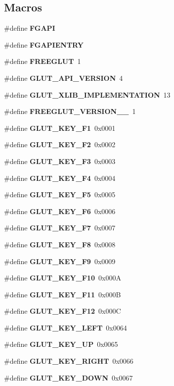 \subsection*{Macros}
\begin{DoxyCompactItemize}
\item 
\#define {\bf F\+G\+A\+P\+I}
\item 
\#define {\bf F\+G\+A\+P\+I\+E\+N\+T\+R\+Y}
\item 
\#define {\bf F\+R\+E\+E\+G\+L\+U\+T}~1
\item 
\#define {\bf G\+L\+U\+T\+\_\+\+A\+P\+I\+\_\+\+V\+E\+R\+S\+I\+O\+N}~4
\item 
\#define {\bf G\+L\+U\+T\+\_\+\+X\+L\+I\+B\+\_\+\+I\+M\+P\+L\+E\+M\+E\+N\+T\+A\+T\+I\+O\+N}~13
\item 
\#define {\bf F\+R\+E\+E\+G\+L\+U\+T\+\_\+\+V\+E\+R\+S\+I\+O\+N\+\_\+\_}~1
\item 
\#define {\bf G\+L\+U\+T\+\_\+\+K\+E\+Y\+\_\+\+F1}~0x0001
\item 
\#define {\bf G\+L\+U\+T\+\_\+\+K\+E\+Y\+\_\+\+F2}~0x0002
\item 
\#define {\bf G\+L\+U\+T\+\_\+\+K\+E\+Y\+\_\+\+F3}~0x0003
\item 
\#define {\bf G\+L\+U\+T\+\_\+\+K\+E\+Y\+\_\+\+F4}~0x0004
\item 
\#define {\bf G\+L\+U\+T\+\_\+\+K\+E\+Y\+\_\+\+F5}~0x0005
\item 
\#define {\bf G\+L\+U\+T\+\_\+\+K\+E\+Y\+\_\+\+F6}~0x0006
\item 
\#define {\bf G\+L\+U\+T\+\_\+\+K\+E\+Y\+\_\+\+F7}~0x0007
\item 
\#define {\bf G\+L\+U\+T\+\_\+\+K\+E\+Y\+\_\+\+F8}~0x0008
\item 
\#define {\bf G\+L\+U\+T\+\_\+\+K\+E\+Y\+\_\+\+F9}~0x0009
\item 
\#define {\bf G\+L\+U\+T\+\_\+\+K\+E\+Y\+\_\+\+F10}~0x000\+A
\item 
\#define {\bf G\+L\+U\+T\+\_\+\+K\+E\+Y\+\_\+\+F11}~0x000\+B
\item 
\#define {\bf G\+L\+U\+T\+\_\+\+K\+E\+Y\+\_\+\+F12}~0x000\+C
\item 
\#define {\bf G\+L\+U\+T\+\_\+\+K\+E\+Y\+\_\+\+L\+E\+F\+T}~0x0064
\item 
\#define {\bf G\+L\+U\+T\+\_\+\+K\+E\+Y\+\_\+\+U\+P}~0x0065
\item 
\#define {\bf G\+L\+U\+T\+\_\+\+K\+E\+Y\+\_\+\+R\+I\+G\+H\+T}~0x0066
\item 
\#define {\bf G\+L\+U\+T\+\_\+\+K\+E\+Y\+\_\+\+D\+O\+W\+N}~0x0067

\end{DoxyCompactItemize}
